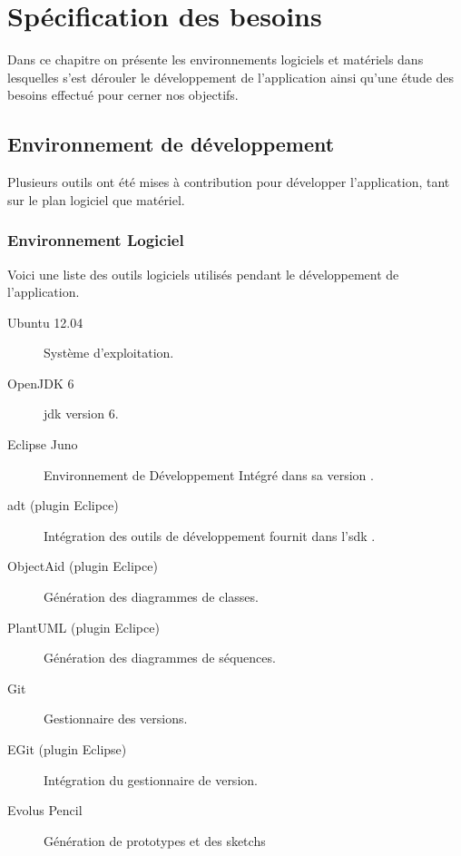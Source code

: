 
\chapter{Spécification des besoins}


Dans ce chapitre on présente les environnements logiciels et matériels dans lesquelles s'est dérouler le développement de l'application ainsi qu'une étude des besoins effectué pour cerner nos objectifs.

\section{Environnement de développement}%

Plusieurs outils ont été mises à contribution pour développer l'application, tant sur le plan logiciel que matériel.

\subsection{Environnement Logiciel}
Voici une liste des outils logiciels utilisés pendant le développement de l'application.

\begin{description}

\item [Ubuntu 12.04] Système d'exploitation.\footnotemark[1]

\item [OpenJDK 6] \gls{jdk} version 6.\footnotemark[2]

\item [Eclipse Juno] Environnement de Développement Intégré dans sa version .\footnotemark[3]

\item [\gls{adt} (plugin Eclipce)] Intégration des outils de développement fournit dans l'\gls{sdk} \android{}.\footnotemark[4]

\item [ObjectAid (plugin Eclipce)] Génération des diagrammes de classes.\footnotemark[5]

\item [PlantUML (plugin Eclipce)] Génération des diagrammes de séquences.\footnotemark[6]

\item [Git] Gestionnaire des versions\footnotemark[7].

\item [EGit (plugin Eclipse)] Intégration du gestionnaire de version.\footnotemark[8]

\item [Evolus Pencil] Génération de prototypes et des sketchs\footnotemark[9]
\end{description}

